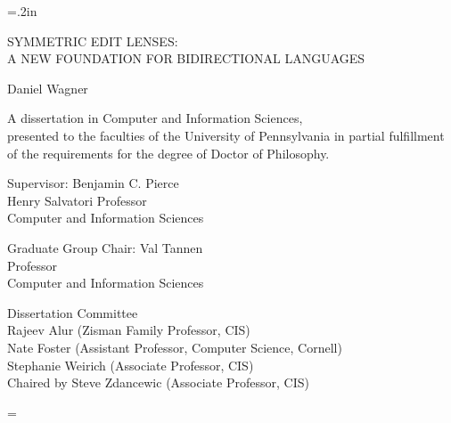\documentclass[12pt]{report}
\numberwithin{equation}{section}
\def\thetitle{\uppercase{Symmetric Edit Lenses:\\A New Foundation For Bidirectional Languages}}
\def\theauthor{Daniel Wagner}
\def\theadvisor{Benjamin C. Pierce}
\def\theyear{2014}
\begin{document}
\doublespacing
\large\newlength{\oldparskip}\setlength\oldparskip{\parskip}\parskip=.2in
\thispagestyle{empty}
\vspace*{\fill}
\begin{center}
\thetitle

\theauthor

\singlespacing
A dissertation in Computer and Information Sciences, \\
presented to the faculties of the University of Pennsylvania in partial
fulfillment of the requirements for the degree of Doctor of Philosophy.

\doublespacing
\theyear
\end{center}

\vspace*{3ex}

\singlespacing
\noindent\makebox[0in][l]{\rule[2ex]{3.5in}{.3mm}}%
Supervisor: \theadvisor \\
Henry Salvatori Professor \\
Computer and Information Sciences

\vspace*{4ex}

\noindent\makebox[0in][l]{\rule[2ex]{3.5in}{.3mm}}%
Graduate Group Chair: Val Tannen \\
Professor \\
Computer and Information Sciences

\vspace*{2ex}

\noindent Dissertation Committee \\
Rajeev Alur (Zisman Family Professor, CIS) \\
Nate Foster (Assistant Professor, Computer Science, Cornell) \\
Stephanie Weirich (Associate Professor, CIS) \\
Chaired by Steve Zdancewic (Associate Professor, CIS)
\vspace*{\fill}

\normalsize\parskip=\oldparskip


\newpage
\doublespacing
\end{document}
